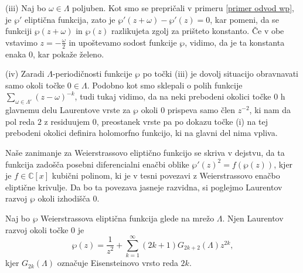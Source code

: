 \documentclass[mat1]{fmfdelo}
\numberwithin{equation}{section}
\newcommand{\C}{\mathbb C}
\newcommand{\om}{\omega}
\theoremstyle{definition}
\begin{document}
\begin{dokaz}
    (iii) Naj bo $\om\in \Lambda$ poljuben. Kot smo se prepričali v primeru \ref{primer odvod wp}, je $\wp'$ eliptična funkcija, zato je $\wp'(z + \om) - \wp'(z) = 0$, kar pomeni, da se funkciji $\wp(z + \om)$ in $\wp(z)$ razlikujeta zgolj za prišteto konstanto. Če v obe vstavimo $z = -\frac{\omega}{2}$ in upoštevamo sodost funkcije $\wp$, vidimo, da je ta konstanta enaka $0$, kar pokaže želeno.

    (iv) Zaradi $\Lambda$-periodičnosti funkcije $\wp$ po točki (iii) je dovolj situacijo obravnavati samo okoli točke $0\in\Lambda$. Podobno kot smo sklepali o polih funkcije $\sum_{\om\in\Lambda'}(z-\om)^{-k}$, tudi tukaj vidimo, da na neki prebodeni okolici točke $0$ h glavnemu delu Laurentove vrste za $\wp$ okoli $0$ prispeva samo člen $z^{-2}$, ki nam da pol reda $2$ z residuujem $0$, preostanek vrste pa po dokazu točke (i) na tej prebodeni okolici definira holomorfno funkcijo, ki na glavni del nima vpliva.  
\end{dokaz}

Naše zanimanje za Weierstrassovo eliptično funkcijo se skriva v dejstvu, da ta funkcija zadošča posebni diferencialni enačbi oblike $\wp'(z)^2 = f(\wp(z))$, kjer je $f \in \C[x]$ kubični polinom, ki je v tesni povezavi z Weierstrassovo enačbo eliptične krivulje. Da bo ta povezava jasneje razvidna, si poglejmo Laurentov razvoj $\wp$ okoli izhodišča $0$. 

\begin{lema}
    Naj bo $\wp$ Weierstrassova eliptična funkcija glede na mrežo $\Lambda$. Njen Laurentov razvoj okoli točke $0$ je
    \begin{equation}
        \label{eq: Laurentov razvoj wp}
        \wp(z) = \frac{1}{z^2} + \sum_{k = 1}^\infty(2k + 1)G_{2k + 2}(\Lambda)z^{2k},  
    \end{equation}
    kjer $G_{2k}(\Lambda)$ označuje Eisensteinovo vrsto reda $2k$.
\end{lema}
\end{document}
